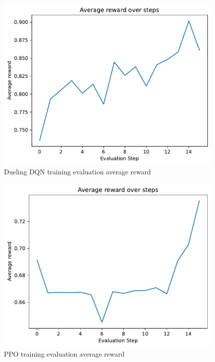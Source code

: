 \documentclass{article}
\begin{document}
\begin{figure}
    \centering
    \includegraphics[width=0.7\linewidth]{img/DuelDQN_training_eval_avg_reward.pdf}
    \caption{Dueling DQN training evaluation average reward}
    \label{fig:Duel_DQN_eval_reward_training}
\end{figure}

\begin{figure}
    \centering
    \includegraphics[width=0.7\linewidth]{img/PPO_training_eval_avg_reward.pdf}
    \caption{PPO training evaluation average reward}
    \label{fig:PPO_eval_reward_training}
\end{figure}
\end{document}
